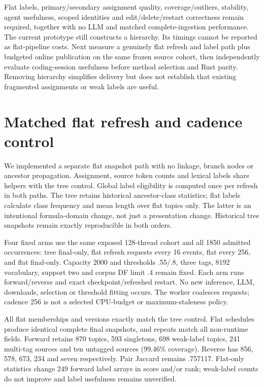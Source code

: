 \documentclass[11pt]{article}
\begin{document}
Flat labels, primary/secondary assignment quality, coverage/outliers, stability,
agent usefulness, scoped identities and edit/delete/restart correctness remain
required, together with no LLM and matched complete-ingestion performance.
The current prototype still constructs a hierarchy. Its timings cannot be
reported as flat-pipeline costs. Next measure a genuinely flat refresh and
label path plus budgeted online publication on the same frozen source cohort,
then independently evaluate coding-session usefulness before method selection
and Rust parity. Removing hierarchy simplifies delivery but does not establish
that existing fragmented assignments or weak labels are useful.

\section{Matched flat refresh and cadence control}
We implemented a separate flat snapshot path with no linkage, branch nodes or
ancestor propagation. Assignment, source token counts and lexical labels share
helpers with the tree control. Global label eligibility is computed once per
refresh in both paths. The tree retains historical ancestor-class statistics;
flat labels calculate class frequency and mean length over flat topics only.
The latter is an intentional formula-domain change, not just a presentation
change. Historical tree snapshots remain exactly reproducible in both orders.

Four fixed arms use the same exposed 128-thread cohort and all 1850 admitted
occurrences: tree final-only, flat refresh requests every 16 events, flat every
256, and flat final-only. Capacity 2000 and thresholds .55/.8, three tags,
8192 vocabulary, support two and corpus DF limit .4 remain fixed. Each arm
runs forward/reverse and exact checkpoint/refreshed restart. No new inference,
LLM, downloads, selection or threshold fitting occurs. The worker coalesces
requests; cadence 256 is not a selected CPU-budget or maximum-staleness policy.

All flat memberships and versions exactly match the tree control. Flat schedules
produce identical complete final snapshots, and repeats match all non-runtime
fields. Forward retains 870 topics, 593 singletons, 698 weak-label topics,
241 multi-tag sources and ten untagged sources (99.46\% coverage). Reverse has
856, 578, 673, 234 and seven respectively. Pair Jaccard remains .757117.
Flat-only statistics change 249 forward label arrays in score and/or rank;
weak-label counts do not improve and label usefulness remains unverified.
\end{document}
